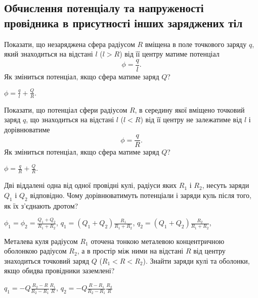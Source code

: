 \subsection*{Обчислення потенціалу та напруженості провідника в присутності інших заряджених тіл}


\begin{problem}\label{potential_of_sphere_in_particle_field}
	Показати, що незаряджена сфера радіусом $R$ вміщена в поле точкового заряду $q$, який знаходиться на відстані $l$ ($l > R$) від її центру матиме потенціал
	\[
		\phi = \frac{q}{l}.
	\]
	Як зміниться потенціал, якщо сфера матиме заряд $Q$?
	\begin{solution}
		$\phi = \frac{q}{l} + \frac{Q}{R}.$
	\end{solution}
\end{problem}


\begin{problem}
	Показати, що потенціал сфери радіусом $R$, в середину якої вміщено точковий заряд $q$, що знаходиться на відстані $l$ ($l <R$) від її центру не залежатиме від $l$ і дорівнюватиме
	\[
	\phi = \frac{q}{R}.
	\]
	Як зміниться потенціал, якщо сфера матиме заряд $Q$?
	\begin{solution}
		$\phi = \frac{q}{R} + \frac{Q}{R}.$
	\end{solution}
\end{problem}

\begin{problem}\label{connecting_spheres}
Дві віддалені одна від одної провідні кулі, радіуси яких $R_1$ і $R_2$, несуть заряди $Q_1$ і $Q_2$ відповідно. Чому дорівнюватимуть потенціали і заряди куль після того, як їх з'єднають дротом?
\begin{solution}
	$\phi_1 = \phi_2 = \frac{Q_1 + Q_2}{R_1 + R_2}$, $q_1 = (Q_1 + Q_2) \frac{R_1}{R_1 + R_2}$, $q_2 = (Q_1 + Q_2) \frac{R_2}{R_1 + R_2}$,
\end{solution}
\end{problem}

\begin{problem}
Металева куля радіусом $R_1$ оточена тонкою металевою концентричною оболонкою радіусом $R_2$, а в простір між ними на відстані $R$ від центру знаходиться точковий заряд $Q$ ($R_1 <R <R_2$). Знайти заряди кулі та оболонки, якщо обидва провідники заземлені?
\begin{solution}
	$q_1 = -Q\frac{R_2-R}{R_2-R_1}\frac{R_1}{R}$, $q_2 = -Q\frac{R-R_1}{R_2-R_1}\frac{R_2}{R}$
\end{solution}
\end{problem}


